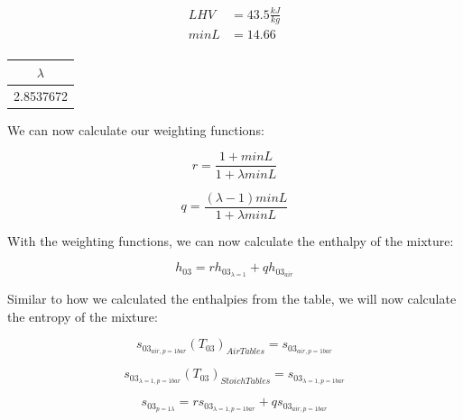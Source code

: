 \documentclass[titlepage]{article}
\begin{document}
    \begin{equation}
        \begin{aligned}
            \text{$LHV$} &=  43.5 \frac{kJ}{kg} \\
            \text{$minL$} &=  14.66 \\
        \end{aligned}
    \end{equation}

    \begin{center}
        \begin{tabular}{|c|}
            \hline
            $\lambda$ \\
            \hline
            2.8537672 \\
            \hline
        \end{tabular}
    \end{center}

    We can now calculate our weighting functions:

    \begin{equation}
        r = \frac{1 + minL}{1 + \lambda minL}
    \end{equation}

    \begin{equation}
        q = \frac{(\lambda -1)minL}{1+\lambda minL}
    \end{equation}

    With the weighting functions, we can now calculate the enthalpy of the mixture:

    \begin{equation}
        h_{03} = r h_{03_{\lambda=1}} + q h_{03_{air}}
    \end{equation}

    Similar to how we calculated the enthalpies from the table, we will now calculate the entropy of the mixture:

    \begin{equation}
        s_{03_{air, p= 1 bar}}(T_{03})_{Air Tables} = s_{03_{air, p=1 bar}}
    \end{equation} 

    \begin{equation}
        s_{03_{\lambda=1, p= 1 bar}}(T_{03})_{Stoich  Tables} = s_{03_{\lambda=1, p = 1 bar}}
    \end{equation}

    \begin{equation}
        s_{03_{p=1 \lambda}} = r s_{03_{\lambda=1, p=1 bar}} + q s_{03_{air, p=1 bar}}
    \end{equation}
\end{document}
